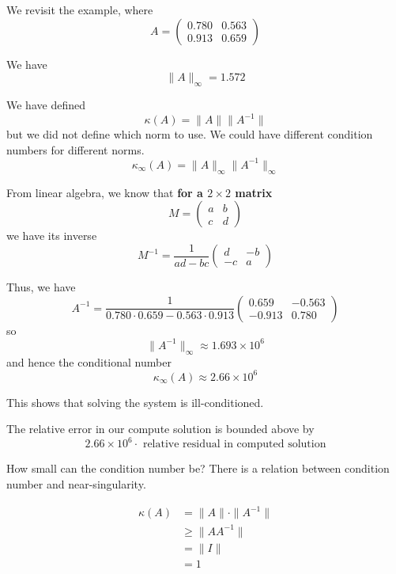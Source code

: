 \begin{example}
    We revisit the example, where \[
        A = \begin{pmatrix}
            0.780 & 0.563 \\ 0.913 & 0.659
        \end{pmatrix}
    \]

    We have \[
        \| A \|_\infty = 1.572
    \]

    We have defined \[
        \kappa(A) = \| A \| \| A^{-1} \|
    \] but we did not define which norm to use. We could have different condition numbers for different norms. \[
        \kappa_\infty(A) = \| A \|_\infty \| A^{-1} \|_\infty
    \]

    From linear algebra, we know that \textbf{for a \( 2 \times 2 \) matrix} \[
        M = \begin{pmatrix}
            a & b \\ c & d
        \end{pmatrix}
    \] we have its inverse \[
        M^{-1} = \frac{1}{ad - bc} \begin{pmatrix}
            d & -b \\ -c & a
        \end{pmatrix}
    \]

    Thus, we have \[
        A^{-1} = \frac{1}{0.780 \cdot 0.659 - 0.563 \cdot 0.913} \begin{pmatrix}
            0.659 & -0.563 \\ -0.913 & 0.780
        \end{pmatrix}
    \] so \[
        \| A^{-1} \|_\infty \approx 1.693 \times 10^6
    \] and hence the conditional number \[
        \kappa_\infty(A) \approx 2.66 \times 10^6
    \]

    This shows that solving the system is ill-conditioned.

    The relative error in our compute solution is bounded above by \[
        2.66 \times 10^6 \cdot \text{ relative residual in computed solution}
    \]
\end{example}

How small can the condition number be? There is a relation between condition number and near-singularity.

\begin{align*}
    \kappa(A)
     & = \| A \| \cdot \| A^{-1} \| \\
     & \geq \| A A^{-1} \|          \\
     & = \| I \|                    \\
     & = 1
\end{align*}

